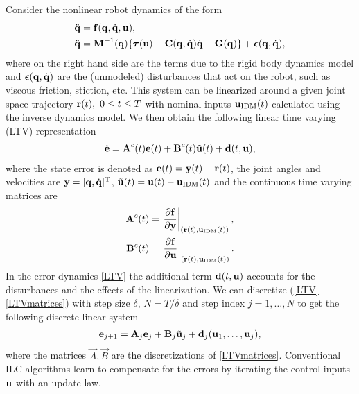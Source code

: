 Consider the nonlinear robot dynamics of the form
%
\begin{equation}
\begin{aligned}
\ddot{\boldsymbol{\mathrm{q}}} &= \boldsymbol{\mathrm{f}}(\boldsymbol{\mathrm{q}},\dot{\boldsymbol{\mathrm{q}}},\boldsymbol{\mathrm{u}}), \\
\ddot{\boldsymbol{\mathrm{q}}} &= \boldsymbol{\mathrm{M}}^{-1}(\boldsymbol{\mathrm{q}})\{ \boldsymbol{\mathrm{\tau}}(\boldsymbol{\mathrm{u}}) - \boldsymbol{\mathrm{C}}(\boldsymbol{\mathrm{q}},\dot{\boldsymbol{\mathrm{q}}})\dot{\boldsymbol{\mathrm{q}}} - \boldsymbol{\mathrm{G}}(\boldsymbol{\mathrm{q}})\} + \boldsymbol{\mathrm{\epsilon}}(\boldsymbol{\mathrm{q}},\dot{\boldsymbol{\mathrm{q}}}),\\
\end{aligned}
\label{dynamics}
\end{equation}
%
\noindent where on the right hand side are the terms due to the rigid body dynamics model and $\boldsymbol{\mathrm{\epsilon}}(\boldsymbol{\mathrm{q}},\dot{\boldsymbol{\mathrm{q}}})$ are the (unmodeled) disturbances that act on the robot, such as viscous friction, stiction, etc. This system can be linearized around a given joint space trajectory $\boldsymbol{\mathrm{r}}(t), \ 0 \leq t \leq T$ with nominal inputs $\boldsymbol{\mathrm{u}}_{\mathrm{IDM}}(t)$ calculated using the inverse dynamics model. We then obtain the following linear time varying (LTV) representation
%
\begin{equation}
\begin{aligned}
\dot{\boldsymbol{\mathrm{e}}} = \boldsymbol{\mathrm{A}}^{c}(t)\boldsymbol{\mathrm{e}}(t) + \boldsymbol{\mathrm{B}}^{c}(t)\tilde{\boldsymbol{\mathrm{u}}}(t) + \boldsymbol{\mathrm{d}}(t,\boldsymbol{\mathrm{u}}),
\end{aligned}
\label{LTV}
\end{equation}
%
\noindent where the state error is denoted as $\boldsymbol{\mathrm{e}}(t) = \boldsymbol{\mathrm{y}}(t) - \boldsymbol{\mathrm{r}}(t)$, the joint angles and velocities are $\boldsymbol{\mathrm{y}} = [\boldsymbol{\mathrm{q}},\dot{\boldsymbol{\mathrm{q}}}]^{\mathrm{T}}$, $\tilde{\boldsymbol{\mathrm{u}}}(t) = \boldsymbol{\mathrm{u}}(t) - \boldsymbol{\mathrm{u}}_{\mathrm{IDM}}(t)$ and the continuous time varying matrices are
%
\begin{equation}
\begin{aligned}
\boldsymbol{\mathrm{A}}^{c}(t) &= \left.\frac{\partial{\boldsymbol{\mathrm{f}}}}{\partial{\boldsymbol{\mathrm{y}}}}\right|_{(\boldsymbol{\mathrm{r}}(t),\boldsymbol{\mathrm{u}}_{\mathrm{IDM}}(t))}, \\
\boldsymbol{\mathrm{B}}^{c}(t) &= \left.\frac{\partial{\boldsymbol{\mathrm{f}}}}{\partial{\boldsymbol{\mathrm{u}}}}\right|_{(\boldsymbol{\mathrm{r}}(t),\boldsymbol{\mathrm{u}}_{\mathrm{IDM}}(t))}.
\end{aligned}
\label{LTVmatrices}
\end{equation}
%
\noindent In the error dynamics \eqref{LTV} the additional term $\boldsymbol{\mathrm{d}}(t,\boldsymbol{\mathrm{u}})$ accounts for the disturbances and the effects of the linearization. We can discretize (\ref{LTV}-\ref{LTVmatrices}) with step size $\delta$, $N = T/\delta$ and step index $j = 1, \ldots, N$ to get the following discrete linear system
%
\begin{equation}
\begin{aligned}
\boldsymbol{\mathrm{e}}_{j+1} = \boldsymbol{\mathrm{A}}_j\boldsymbol{\mathrm{e}}_j + \boldsymbol{\mathrm{B}}_j\tilde{\boldsymbol{\mathrm{u}}}_j + \boldsymbol{\mathrm{d}}_j(\boldsymbol{\mathrm{u}}_1, \ldots, \boldsymbol{\mathrm{u}}_j),
\end{aligned}
\label{discreteLTV}
\end{equation}
%
\noindent where the matrices $\vec{A}, \vec{B}$ are the discretizations of \eqref{LTVmatrices}. Conventional ILC algorithms learn to compensate for the errors by iterating the control inputs $\boldsymbol{\mathrm{u}}$ with an update law.